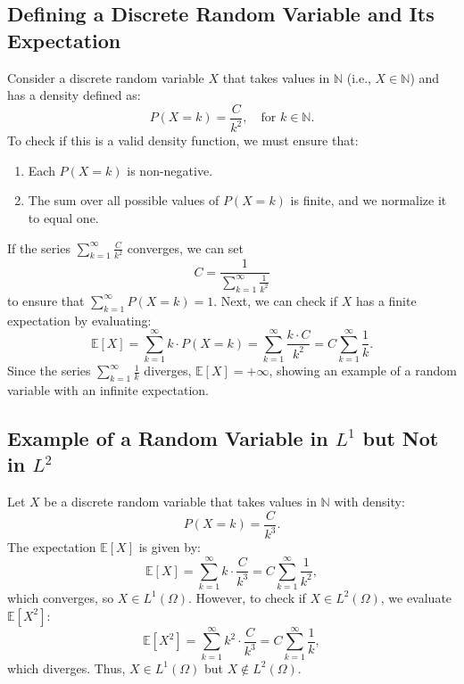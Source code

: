     \subsection{Defining a Discrete Random Variable and Its Expectation}
    Consider a discrete random variable \( X \) that takes values in \( \mathbb{N} \) (i.e., \( X \in \mathbb{N} \)) and has a density defined as:
    \[
    P(X = k) = \frac{C}{k^2}, \quad \text{for } k \in \mathbb{N}.
    \]
    To check if this is a valid density function, we must ensure that:
    \begin{enumerate}
        \item Each \( P(X = k) \) is non-negative.
        \item The sum over all possible values of \( P(X = k) \) is finite, and we normalize it to equal one.
    \end{enumerate}
    If the series \( \sum_{k=1}^{\infty} \frac{C}{k^2} \) converges, we can set 
    \[ C = \frac{1}{\sum_{k=1}^{\infty} \frac{1}{k^2}} \] 
    to ensure that \( \sum_{k=1}^{\infty} P(X = k) = 1 \). \newline
    Next, we can check if \( X \) has a finite expectation by evaluating:
    \[
    \mathbb{E}[X] = \sum_{k=1}^{\infty} k \cdot P(X = k) = \sum_{k=1}^{\infty} \frac{k \cdot C}{k^2} = C \sum_{k=1}^{\infty} \frac{1}{k}.
    \]
    Since the series \( \sum_{k=1}^{\infty} \frac{1}{k} \) diverges, \( \mathbb{E}[X] = +\infty \), showing an example of a random variable with an infinite expectation.

    \subsection{Example of a Random Variable in \( L^1 \) but Not in \( L^2 \)}
    
    Let \( X \) be a discrete random variable that takes values in \( \mathbb{N} \) with density:
    \[
    P(X = k) = \frac{C}{k^3}.
    \]
    The expectation \( \mathbb{E}[X] \) is given by:
    \[
    \mathbb{E}[X] = \sum_{k=1}^{\infty} k \cdot \frac{C}{k^3} = C \sum_{k=1}^{\infty} \frac{1}{k^2},
    \]
    which converges, so \( X \in L^1(\Omega) \). \newline
    However, to check if \( X \in L^2(\Omega) \), we evaluate \( \mathbb{E}[X^2] \):
    \[
    \mathbb{E}[X^2] = \sum_{k=1}^{\infty} k^2 \cdot \frac{C}{k^3} = C \sum_{k=1}^{\infty} \frac{1}{k},
    \]
    which diverges. Thus, \( X \in L^1(\Omega) \) but \( X \notin L^2(\Omega) \).
    
